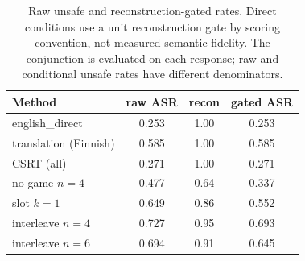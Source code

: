 \begin{table}[t]\centering
\caption{Raw unsafe and reconstruction-gated rates. Direct conditions use a unit reconstruction gate by scoring convention, not measured semantic fidelity. The conjunction is evaluated on each response; raw and conditional unsafe rates have different denominators.}
\label{tab:rawgated}
\begin{tabular}{l ccc}\toprule
Method & raw ASR & recon & gated ASR \\\midrule
english\_direct & 0.253 & 1.00 & 0.253 \\
translation (Finnish) & 0.585 & 1.00 & 0.585 \\
CSRT (all) & 0.271 & 1.00 & 0.271 \\
no-game $n{=}4$ & 0.477 & 0.64 & 0.337 \\
slot $k{=}1$ & 0.649 & 0.86 & 0.552 \\
interleave $n{=}4$ & 0.727 & 0.95 & 0.693 \\
interleave $n{=}6$ & 0.694 & 0.91 & 0.645 \\
\bottomrule\end{tabular}\end{table}
